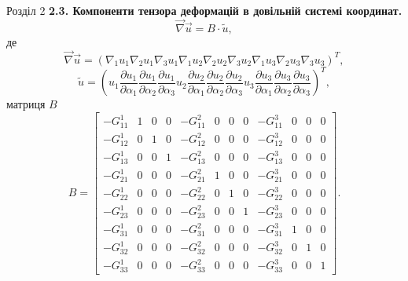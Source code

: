 \documentclass[8pt]{beamer}
\numberwithin{figure}{section}
\numberwithin{equation}{section}
\numberwithin{table}{section}
\begin{document}
\begin{frame}{Розділ 2}
\textbf{2.3. Компоненти тензора деформацій в довільній системі координат.}
\begin{equation}
\vec{\nabla} \vec{u} =  
B \cdot \tilde{u},
\end{equation}
де \\
\begin{equation}
\vec{\nabla} \vec{u} =  \left(
\nabla_1 u_1  \nabla_2 u_1  \nabla_3 u_1 \nabla_1 u_2  \nabla_2 u_2  \nabla_3 u_2 
\nabla_1 u_3  \nabla_2 u_3  \nabla_3 u_3 
\right)^T,
\end{equation}
\begin{equation}
 \tilde{u} =  \left( u_1 
\frac { \partial u_1 } { \partial \alpha_1} 
\frac { \partial u_1 } { \partial \alpha_2} 
\frac { \partial u_1 } { \partial \alpha_3} 
u_2 
\frac { \partial u_2 } { \partial \alpha_1} 
\frac { \partial u_2 } { \partial \alpha_2} 
\frac { \partial u_2 } { \partial \alpha_3} 
u_3 
\frac { \partial u_3 } { \partial \alpha_1} 
\frac { \partial u_3 } { \partial \alpha_2} 
\frac { \partial u_3 } { \partial \alpha_3} 
\right)^T,
\end{equation}
матриця $B$
\begin{equation}\label{eq:matrixB}
B=
\left[\begin{array}{cccccccccccc}
-G_{11}^1 & 1 & 0 & 0 & -G_{11}^2 & 0 & 0 & 0 & -G_{11}^3 & 0 & 0 & 0\\
-G_{12}^1 & 0 & 1 & 0 & -G_{12}^2 & 0 & 0 & 0 & -G_{12}^3 & 0 & 0 & 0\\
-G_{13}^1 & 0 & 0 & 1 & -G_{13}^2 & 0 & 0 & 0 & -G_{13}^3 & 0 & 0 & 0\\
-G_{21}^1 & 0 & 0 & 0 & -G_{21}^2 & 1 & 0 & 0 & -G_{21}^3 & 0 & 0 & 0\\
-G_{22}^1 & 0 & 0 & 0 & -G_{22}^2 & 0 & 1 & 0 & -G_{22}^3 & 0 & 0 & 0\\
-G_{23}^1 & 0 & 0 & 0 & -G_{23}^2 & 0 & 0 & 1 & -G_{23}^3 & 0 & 0 & 0\\
-G_{31}^1 & 0 & 0 & 0 & -G_{31}^2 & 0 & 0 & 0 & -G_{31}^3 & 1 & 0 & 0\\
-G_{32}^1 & 0 & 0 & 0 & -G_{32}^2 & 0 & 0 & 0 & -G_{32}^3 & 0 & 1 & 0\\
-G_{33}^1 & 0 & 0 & 0 & -G_{33}^2 & 0 & 0 & 0 & -G_{33}^3 & 0 & 0 & 1
\end{array}\right].
\end{equation}

\end{frame}
\end{document}
